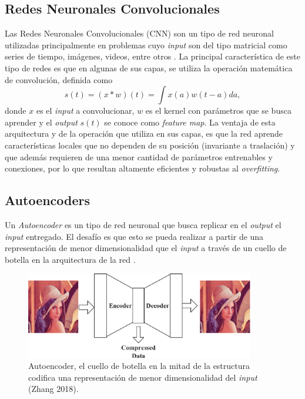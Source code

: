 \subsection{Redes Neuronales Convolucionales}

Las Redes Neuronales Convolucionales (CNN) son un tipo de red neuronal utilizadas principalmente en problemas cuyo \textit{input} son del tipo matricial como series de tiempo, imágenes, videos, entre otros \cite{INDOLIA2018679}. La principal característica de este tipo de redes es que en algunas de sus capas, se utiliza la operación matemática de convolución, definida como 
\[
s(t) = (x * w)(t) = \int x(a)w(t-a)da , 
\]
donde $x$ es el \textit{input} a convolucionar, $w$ es el kernel con parámetros que se busca aprender y el \textit{output} $s(t)$ se conoce como \textit{feature map}. La ventaja de esta arquitectura y de la operación que utiliza en sus capas, es que la red aprende características locales que no dependen de su posición (invariante a traslación) y que además requieren de una menor cantidad de parámetros entrenables y conexiones, por lo que resultan altamente eficientes y robustas al \textit{overfitting}.
 
\subsection{Autoencoders}

Un \textit{Autoencoder} es un tipo de red neuronal que busca replicar en el \textit{output} el \textit{input} entregado. El desafío es que esto se pueda realizar a partir de una representación de menor dimensionalidad que el \textit{input} a través de un cuello de botella en la arquitectura de la red \cite{Zhang2018ABA}.


\begin{figure}[ht]
    \centering
    \includegraphics[width=10cm]{img/tesis/autoencoder.png}
    \caption{Autoencoder, el cuello de botella en la mitad de la estructura codifica una representación de menor dimensionalidad del \textit{input} (Zhang 2018).}
    \label{fig:autoencoder}
\end{figure}


